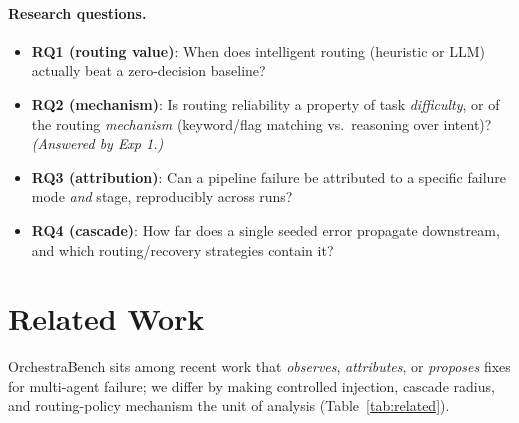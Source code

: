 \documentclass[sigconf,nonacm,anonymous]{acmart}  %
\begin{document}
\paragraph{Research questions.}
\begin{itemize}
  \item \textbf{RQ1 (routing value)}: When does intelligent routing (heuristic or
  LLM) actually beat a zero-decision baseline?
  \item \textbf{RQ2 (mechanism)}: Is routing reliability a property of task
  \emph{difficulty}, or of the routing \emph{mechanism} (keyword/flag matching
  vs.\ reasoning over intent)? \emph{(Answered by Exp 1.)}
  \item \textbf{RQ3 (attribution)}: Can a pipeline failure be attributed to a
  specific failure mode \emph{and} stage, reproducibly across runs?
  \item \textbf{RQ4 (cascade)}: How far does a single seeded error propagate
  downstream, and which routing/recovery strategies contain it?
\end{itemize}

\section{Related Work}
\label{sec:related}
OrchestraBench sits among recent work that \emph{observes}, \emph{attributes}, or
\emph{proposes} fixes for multi-agent failure; we differ by making controlled
injection, cascade radius, and routing-policy mechanism the unit of analysis
(Table~\ref{tab:related}).
\end{document}
